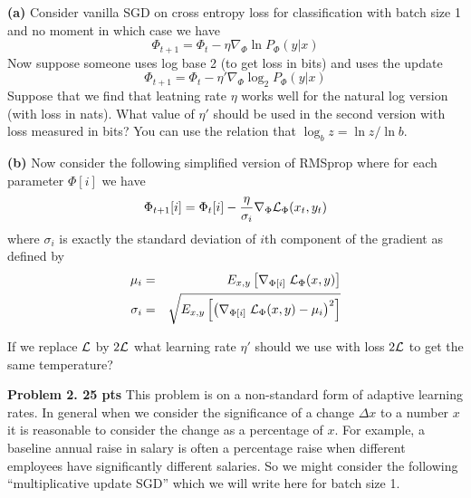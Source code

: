 \documentclass{article}
\newcommand{\solution}[1]{}
\begin{document}
    \medskip

{\bf (a)} Consider vanilla SGD on cross entropy loss for classification with batch size 1 and no moment in which case we have
$$\Phi_{t+1} = \Phi_t - \eta \nabla_\Phi \ln P_\Phi(y|x)$$
Now suppose someone uses log base 2 (to get loss in bits) and uses the update
$$\Phi_{t+1} = \Phi_t - \eta' \nabla_\Phi \log_2 P_\Phi(y|x)$$
Suppose that we find that leatning rate $\eta$ works well for the natural log version (with loss in nats).
What value of $\eta'$ should be used in the second version with loss measured in bits?
You can use the relation that $\log_b z = \ln z/\ln b$.

\solution{We have
  \begin{eqnarray*}
    - \Delta \Phi & = & \eta'\nabla_\Phi \log_2 P(\Phi) \\
    & = & \eta' \nabla_\Phi \ln P(\Phi)/\ln 2 \\
    & = & \frac{\eta'}{\ln 2} \nabla_\Phi \ln P(\Phi)
  \end{eqnarray*}
  To make the two updates the same we set $\eta' = \eta \ln 2$
  }

\medskip
    
{\bf (b)} Now consider the following simplified version of RMSprop where for each parameter $\Phi[i]$ we have
$$\Phi_{t+1}[i] = \Phi_t[i] - \frac{\eta}{\sigma_i} \nabla_\Phi {\cal L}_\Phi(x_t,y_t)$$
where $\sigma_i$ is exactly the standard deviation of $i$th component of the gradient as defined by
\begin{eqnarray*}
  \mu_i & = & E_{x,y}\left[\nabla_{\Phi[i]} \;{\cal L}_\Phi(x,y) \right] \\
  \sigma_i & = & \sqrt{E_{x,y}\left[\left(\nabla_{\Phi[i]} \;{\cal L}_\Phi(x,y) - \mu_i\right)^2\right]}
\end{eqnarray*}

If we replace ${\cal L}$ by $2{\cal L}$ what learning rate $\eta'$ should we use with loss $2{\cal L}$ to get the same temperature?

\solution{If we double the loss function we also double $\sigma_i$ and we have $\eta' = \eta$.  For RMSprop we get that the learning rate is (approximately) invariant
to scaling the loss function.  It is not clear whether this has any significance.}

\bigskip
{\bf Problem 2. 25 pts}  This problem is on a non-standard form of adaptive learning rates.  In general when we consider the significance of a change $\Delta x$ to a number $x$ it is reasonable to consider
the change as a percentage of $x$.  For example, a baseline annual raise in salary is often a percentage raise when different employees have significantly different salaries.  So we might consider the following
``multiplicative update SGD'' which we will write here for batch size 1.
\end{document}
